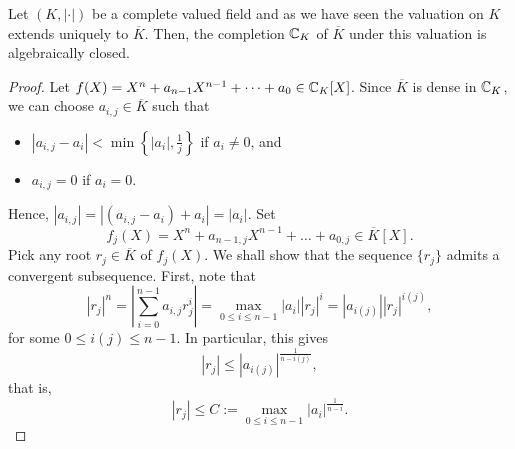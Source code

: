 \begin{theorem}
    Let $(K, |\cdot|)$ be a complete valued field and as we have seen the valuation on $K$ extends uniquely to $\overline K$. Then, the completion $\mathbb{C}_K$ of $\overline K$ under this valuation is algebraically closed.
\end{theorem}
\begin{proof}
    Let $f(X) = X^n + a_{n - 1}X^{n - 1} + \dots + a_0\in\mathbb{C}_K[X]$. Since $\overline K$ is dense in $\mathbb{C}_K$, we can choose $a_{i, j}\in\overline K$ such that 
    \begin{itemize}
        \item $|a_{i, j} - a_i| < \min\left\{|a_i|, \frac{1}{j}\right\}$ if $a_i\ne 0$, and 
        \item $a_{i, j} = 0$ if $a_i = 0$.
    \end{itemize}
    Hence, $|a_{i, j}| = |(a_{i, j} - a_i) + a_i| = |a_i|$. Set 
    \begin{equation*}
        f_j(X) = X^n + a_{n - 1, j}X^{n - 1} + \dots + a_{0, j}\in\overline K[X].
    \end{equation*}
    Pick any root $r_j\in\overline K$ of $f_j(X)$. We shall show that the sequence $\{r_j\}$ admits a convergent subsequence. First, note that 
    \begin{equation*}
        |r_j|^n = \left|\sum_{i = 0}^{n - 1} a_{i, j}r_j^i\right| = \max_{0\le i\le n - 1} |a_i| |r_j|^i = |a_{i(j)}| |r_j|^{i(j)},
    \end{equation*}
    for some $0\le i(j)\le n - 1$. In particular, this gives 
    \begin{equation*}
        |r_j|\le |a_{i(j)}|^{\frac{1}{n - i(j)}},
    \end{equation*}
    that is, 
    \begin{equation*}
        |r_j|\le C := \max_{0\le i\le n - 1} |a_i|^{\frac{1}{n - i}}.
    \end{equation*}


\end{proof}
